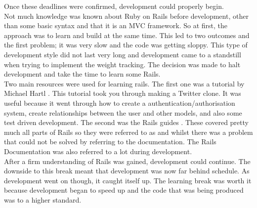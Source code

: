 \noindent
Once these deadlines were confirmed, development could properly begin.\\

Not much knowledge was known about Ruby on Rails before development, other than some basic syntax and that it is an MVC  framework. So at first, the approach was to learn and build at the same time. This led to two outcomes and the first problem; it was very slow and the code was getting sloppy. This type of development style did not last very long and development came to a standstill when trying to implement the weight tracking. The decision was made to halt development and take the time to learn some Rails.\\

Two main resources were used for learning rails. The first one was a tutorial by Michael Hartl \citep{michael:2013}. This tutorial took you through making a Twitter \citep{twitter:2006} clone. It was useful because it went through how to create a authentication/authorisation system, create relationships between the user and other models, and also some test driven development. The second was the Rails guides \citep{guides:2013}. These covered pretty much all parts of Rails so they were referred to as and whilst there was a problem that could not be solved by referring to the documentation. The Rails Documentation was also referred to a lot during development.\\

After a firm understanding of Rails was gained, development could continue. The downside to this break meant that development was now far behind schedule. As development went on though, it caught itself up. The learning break was worth it because development began to speed up and the code that was being produced was to a higher standard.\\

